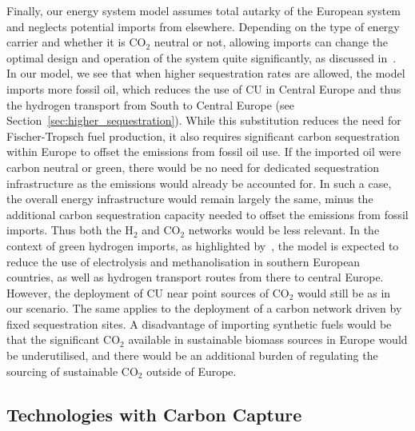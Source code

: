 \documentclass[twocolumn]{article}
\newcommand{\carbon}{CO$_2$}
\newcommand{\hydrogen}{H$_2$}
\begin{document}
Finally, our energy system model assumes total autarky of the European system and neglects potential imports from elsewhere. Depending on the type of energy carrier and whether it is \carbon{} neutral or not, allowing imports can change the optimal design and operation of the system quite significantly, as discussed in~\cite{neumannEnergyImportsInfrastructure2024}. In our model, we see that when higher sequestration rates are allowed, the model imports more fossil oil, which reduces the use of CU in Central Europe and thus the hydrogen transport from South to Central Europe (see Section~\ref{sec:higher_sequestration}). While this substitution reduces the need for Fischer-Tropsch fuel production, it also requires significant carbon sequestration within Europe to offset the emissions from fossil oil use. If the imported oil were carbon neutral or green, there would be no need for dedicated sequestration infrastructure as the emissions would already be accounted for. In such a case, the overall energy infrastructure would remain largely the same, minus the additional carbon sequestration capacity needed to offset the emissions from fossil imports. Thus both the \hydrogen{} and \carbon{} networks would be less relevant.
In the context of green hydrogen imports, as highlighted by~\cite{neumannEnergyImportsInfrastructure2024}, the model is expected to reduce the use of electrolysis and methanolisation in southern European countries, as well as hydrogen transport routes from there to central Europe. However, the deployment of CU near point sources of \carbon{} would still be as in our scenario. The same applies to the deployment of a carbon network driven by fixed sequestration sites.
A disadvantage of importing synthetic fuels would be that the significant \carbon{} available in sustainable biomass sources in Europe would be underutilised, and there would be an additional burden of regulating the sourcing of sustainable \carbon{} outside of Europe.


\subsection{Technologies with Carbon Capture}
\end{document}

